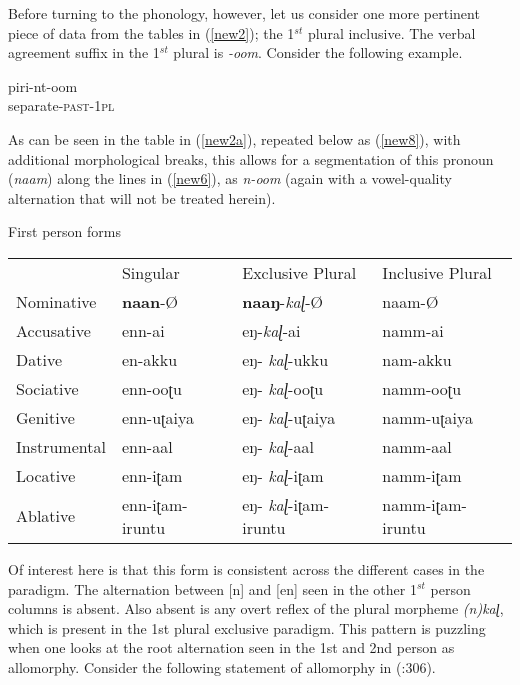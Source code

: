 \documentclass[output=paper,colorlinks,citecolor=brown,
]{langscibook}
\begin{document}
Before turning to the phonology, however, let us consider one more pertinent piece of data from the tables in (\ref{new2}); the 1$^{st}$ plural inclusive. The verbal agreement suffix in the 1$^{st}$ plural is \textit{-oom}. Consider the following example.

\begin{exe}
\ex \label{new7}
\gll piri-nt-oom \\
separate-\textsc{past-1pl}   \\
\end{exe}

As can be seen in the table in (\ref{new2a}), repeated below as (\ref{new8}), with additional morphological breaks, this allows for a segmentation of this pronoun (\textit{naam}) along the lines in (\ref{new6}), as \textit{n-oom} (again with a vowel-quality alternation that will not be treated herein).

\begin{exe} 
\ex \label{new8} First person forms
\begin{table}[]
\begin{tabular}{llll}
             & Singular        & Exclusive Plural      & Inclusive Plural \\
Nominative   & \textbf{naan}-Ø          & \textbf{naaŋ}-\textit{kaɭ}-Ø            & naam-Ø           \\
Accusative   & enn-ai          & eŋ-\textit{kaɭ}-ai             & namm-ai          \\
Dative       & en-akku         & eŋ-   \textit{kaɭ}-ukku        & nam-akku         \\
Sociative    & enn-ooʈu        & eŋ-   \textit{kaɭ}-ooʈu        & namm-ooʈu        \\
Genitive     & enn-uʈaiya      & eŋ-   \textit{kaɭ}-uʈaiya      & namm-uʈaiya      \\
Instrumental & enn-aal         & eŋ-   \textit{kaɭ}-aal         & namm-aal         \\
Locative     & enn-iʈam        & eŋ-   \textit{kaɭ}-iʈam        & namm-iʈam        \\
Ablative     & enn-iʈam-iruntu & eŋ-   \textit{kaɭ}-iʈam-iruntu & namm-iʈam-iruntu
\end{tabular}
\end{table}
\end{exe}

Of interest here is that this form is consistent across the different cases in the paradigm. The alternation between [n] and [en] seen in the other 1$^{st}$ person columns is absent. Also absent is any overt reflex of the plural morpheme \textit{(n)kaɭ}, which is present in the 1st plural exclusive paradigm. This pattern is puzzling when one looks at the root alternation seen in the 1st and 2nd person as allomorphy. Consider the following statement of allomorphy in \citeauthor{moskal2016towards} (\citeyear{moskal2016towards}:306).
\end{document}
